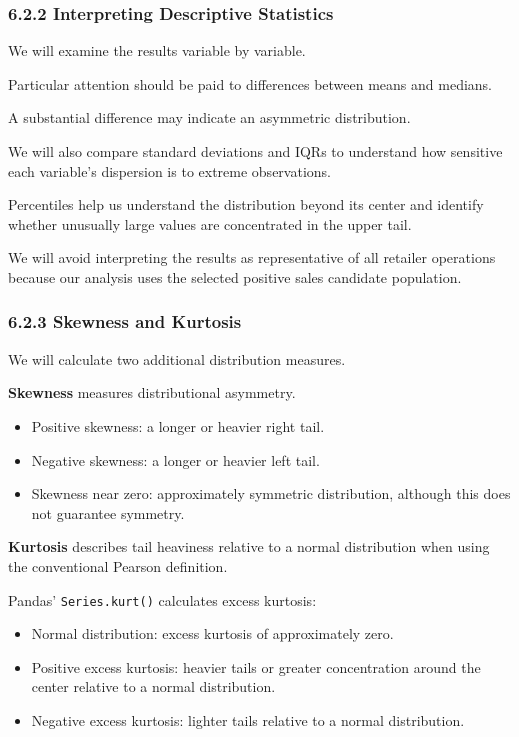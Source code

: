 \documentclass[11pt]{article}
\providecommand{\tightlist}{%
      \setlength{\itemsep}{0pt}\setlength{\parskip}{0pt}}
\begin{document}
    
    \subsubsection{6.2.2 Interpreting Descriptive
Statistics}\label{interpreting-descriptive-statistics}

We will examine the results variable by variable.

Particular attention should be paid to differences between means and
medians.

A substantial difference may indicate an asymmetric distribution.

We will also compare standard deviations and IQRs to understand how
sensitive each variable's dispersion is to extreme observations.

Percentiles help us understand the distribution beyond its center and
identify whether unusually large values are concentrated in the upper
tail.

We will avoid interpreting the results as representative of all retailer
operations because our analysis uses the selected positive sales
candidate population.

    \subsubsection{6.2.3 Skewness and Kurtosis}\label{skewness-and-kurtosis}

We will calculate two additional distribution measures.

\textbf{Skewness} measures distributional asymmetry.

\begin{itemize}
\tightlist
\item
  Positive skewness: a longer or heavier right tail.
\item
  Negative skewness: a longer or heavier left tail.
\item
  Skewness near zero: approximately symmetric distribution, although
  this does not guarantee symmetry.
\end{itemize}

\textbf{Kurtosis} describes tail heaviness relative to a normal
distribution when using the conventional Pearson definition.

Pandas' \texttt{Series.kurt()} calculates excess kurtosis:

\begin{itemize}
\tightlist
\item
  Normal distribution: excess kurtosis of approximately zero.
\item
  Positive excess kurtosis: heavier tails or greater concentration
  around the center relative to a normal distribution.
\item
  Negative excess kurtosis: lighter tails relative to a normal
  distribution.
\end{itemize}
\end{document}
